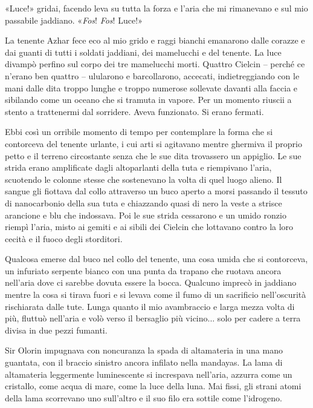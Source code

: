 «Luce!» gridai, facendo leva su tutta la forza e l'aria che mi
rimanevano e sul mio passabile jaddiano. «\emph{Fos}! \emph{Fos}!
\emph{} Luce!»

La tenente Azhar fece eco al mio grido e raggi bianchi emanarono dalle
corazze e dai guanti di tutti i soldati jaddiani, dei mamelucchi e del
tenente. La luce divampò perfino sul corpo dei tre mamelucchi morti.
Quattro Cielcin -- perché ce n'erano ben quattro -- ulularono e
barcollarono, accecati, indietreggiando con le mani dalle dita troppo
lunghe e troppo numerose sollevate davanti alla faccia e sibilando come
un oceano che si tramuta in vapore. Per un momento riuscii a stento a
trattenermi dal sorridere. Aveva funzionato. Si erano fermati.

Ebbi così un orribile momento di tempo per contemplare la forma che si
contorceva del tenente urlante, i cui arti si agitavano mentre ghermiva
il proprio petto e il terreno circostante senza che le sue dita
trovassero un appiglio. Le sue strida erano amplificate dagli
altoparlanti della tuta e riempivano l'aria, scuotendo le colonne stesse
che sostenevano la volta di quel luogo alieno. Il sangue gli fiottava
dal collo attraverso un buco aperto a morsi passando il tessuto di
nanocarbonio della sua tuta e chiazzando quasi di nero la veste a
strisce arancione e blu che indossava. Poi le sue strida cessarono e un
umido ronzio riempì l'aria, misto ai gemiti e ai sibili dei Cielcin che
lottavano contro la loro cecità e il fuoco degli storditori.

Qualcosa emerse dal buco nel collo del tenente, una cosa umida che si
contorceva, un infuriato serpente bianco con una punta da trapano che
ruotava ancora nell'aria dove ci sarebbe dovuta essere la bocca.
Qualcuno imprecò in jaddiano mentre la cosa si tirava fuori e si levava
come il fumo di un sacrificio nell'oscurità rischiarata dalle tute.
Lunga quanto il mio avambraccio e larga mezza volta di più, fluttuò
nell'aria e volò verso il bersaglio più vicino... solo per cadere a
terra divisa in due pezzi fumanti.

Sir Olorin impugnava con noncuranza la spada di altamateria in una mano
guantata, con il braccio sinistro ancora infilato nella mandayas. La
lama di altamateria leggermente luminescente si increspava nell'aria,
azzurra come un cristallo, come acqua di mare, come la luce della luna.
Mai fissi, gli strani atomi della lama scorrevano uno sull'altro e il
suo filo era sottile come l'idrogeno.

